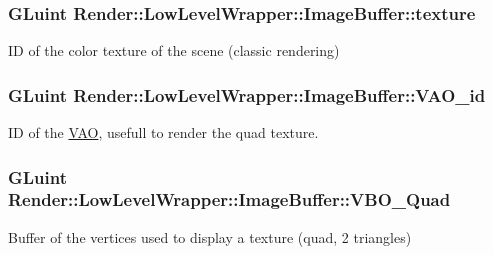 \subsubsection[{\texorpdfstring{texture}{texture}}]{\setlength{\rightskip}{0pt plus 5cm}G\+Luint Render\+::\+Low\+Level\+Wrapper\+::\+Image\+Buffer\+::texture}\hypertarget{struct_render_1_1_low_level_wrapper_1_1_image_buffer_adb265560e8967a5b5d8339e153286365}{}\label{struct_render_1_1_low_level_wrapper_1_1_image_buffer_adb265560e8967a5b5d8339e153286365}


ID of the color texture of the scene (classic rendering) 

\subsubsection[{\texorpdfstring{V\+A\+O\+\_\+id}{VAO_id}}]{\setlength{\rightskip}{0pt plus 5cm}G\+Luint Render\+::\+Low\+Level\+Wrapper\+::\+Image\+Buffer\+::\+V\+A\+O\+\_\+id}\hypertarget{struct_render_1_1_low_level_wrapper_1_1_image_buffer_aa2b457fff3f2bf7dc83fc503cbdfce11}{}\label{struct_render_1_1_low_level_wrapper_1_1_image_buffer_aa2b457fff3f2bf7dc83fc503cbdfce11}


ID of the \hyperlink{struct_render_1_1_low_level_wrapper_1_1_v_a_o}{V\+AO}, usefull to render the quad texture. 

\subsubsection[{\texorpdfstring{V\+B\+O\+\_\+\+Quad}{VBO_Quad}}]{\setlength{\rightskip}{0pt plus 5cm}G\+Luint Render\+::\+Low\+Level\+Wrapper\+::\+Image\+Buffer\+::\+V\+B\+O\+\_\+\+Quad}\hypertarget{struct_render_1_1_low_level_wrapper_1_1_image_buffer_ac231ffe2cf0accdcb974c20b7841dd31}{}\label{struct_render_1_1_low_level_wrapper_1_1_image_buffer_ac231ffe2cf0accdcb974c20b7841dd31}


Buffer of the vertices used to display a texture (quad, 2 triangles) 



